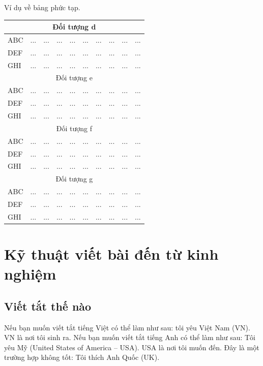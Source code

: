\documentclass[thesis]{femathesis}
\begin{document}
\begin{table}[]{Ví dụ về bảng phức tạp.}
\begin{tabular}{lccccccccc}
        \midrule
        \multicolumn{10}{c}{Đối tượng d}\\
        
        \midrule
        ABC & ... & ... & ... & ... & ... & ... & ... & ... & ... \\ 
        DEF & ... & ... & ... & ... & ... & ... & ... & ... & ... \\
        GHI & ... & ... & ... & ... & ... & ... & ... & ... & ... \\

        \midrule
        \multicolumn{10}{c}{Đối tượng e}\\
        
        \midrule
        ABC & ... & ... & ... & ... & ... & ... & ... & ... & ... \\ 
        DEF & ... & ... & ... & ... & ... & ... & ... & ... & ... \\
        GHI & ... & ... & ... & ... & ... & ... & ... & ... & ... \\

        \midrule
        \multicolumn{10}{c}{Đối tượng f}\\
        
        \midrule
        ABC & ... & ... & ... & ... & ... & ... & ... & ... & ... \\ 
        DEF & ... & ... & ... & ... & ... & ... & ... & ... & ... \\
        GHI & ... & ... & ... & ... & ... & ... & ... & ... & ... \\

        \midrule
        \multicolumn{10}{c}{Đối tượng g}\\
        
        \midrule
        ABC & ... & ... & ... & ... & ... & ... & ... & ... & ... \\ 
        DEF & ... & ... & ... & ... & ... & ... & ... & ... & ... \\
        GHI & ... & ... & ... & ... & ... & ... & ... & ... & ... \\
        \bottomrule
    \end{tabular}
\end{table}


\chapter{Kỹ thuật viết bài đến từ kinh nghiệm}
\section{Viết tắt thế nào}
Nếu bạn muốn viết tắt tiếng Việt có thể làm như sau: tôi yêu Việt Nam (VN). VN là nơi tôi sinh ra. Nếu bạn muốn viết tắt tiếng Anh có thể làm như sau: Tôi yêu Mỹ (United States of America -- USA). USA là nơi tôi muốn đến. Đây là một trường hợp không tốt: Tôi thích Anh Quốc (UK).
\end{document}
